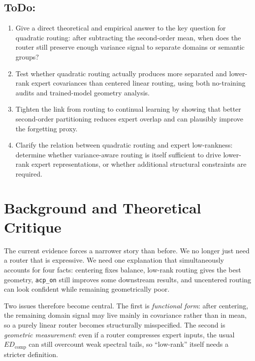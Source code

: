 \documentclass[11pt]{article}
\newcommand{\idea}[1]{\textcolor{red}{[#1]}}
\begin{document}
\subsection{ToDo:}
\begin{enumerate}
    \item Give a direct theoretical and empirical answer to the key question for quadratic routing: after subtracting the second-order mean, when does the router still preserve enough variance signal to separate domains or semantic groups?
    \item Test whether quadratic routing actually produces more separated and lower-rank expert covariances than centered linear routing, using both no-training audits and trained-model geometry analysis.
    \item Tighten the link from routing to continual learning by showing that better second-order partitioning reduces expert overlap and can plausibly improve the forgetting proxy.
    \item Clarify the relation between quadratic routing and expert low-rankness: determine whether variance-aware routing is itself sufficient to drive lower-rank expert representations, or whether additional structural constraints are required.
\end{enumerate}

\section{Background and Theoretical Critique}





The current evidence forces a narrower story than before. We no longer just need a router that is expressive. We need one explanation that simultaneously accounts for four facts: centering fixes balance, low-rank routing gives the best geometry, \texttt{acp\_on} still improves some downstream results, and uncentered routing can look confident while remaining geometrically poor.

Two issues therefore become central. The first is \emph{functional form}: after centering, the remaining domain signal may live mainly in covariance rather than in mean, so a purely linear router becomes structurally misspecified. The second is \emph{geometric measurement}: even if a router compresses expert inputs, the usual $ED_{\mathrm{comp}}$ can still overcount weak spectral tails, so ``low-rank'' itself needs a stricter definition.
\end{document}
